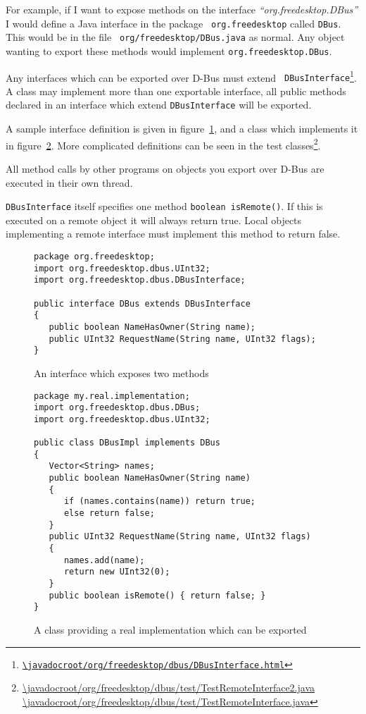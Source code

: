 \documentclass[a4paper,12pt]{article}
\begin{document}
For example, if I want to expose methods on the interface {\em
``org.freedesktop.DBus''} I would define a Java interface in the package {\tt
org.freedesktop} called {\tt DBus}. This would be in the file {\tt
org/freedesktop/DBus.java} as normal. Any object wanting to export these
methods would implement {\tt org.freedesktop.DBus}.

Any interfaces which can be exported over D-Bus must extend {\tt
DBusInterface\footnote{\url{\javadocroot/org/freedesktop/dbus/DBusInterface.html}}}.
A class may implement more than one exportable interface, all public methods
declared in an interface which extend {\tt DBusInterface} will be exported.

A sample interface definition is given in figure~\ref{fig:interface}, and a
class which implements it in figure~\ref{fig:class}. More complicated
definitions can be seen in the test
classes\footnote{\url{\javadocroot/org/freedesktop/dbus/test/TestRemoteInterface2.java}
\url{\javadocroot/org/freedesktop/dbus/test/TestRemoteInterface.java}}.

All method calls by other programs on objects you export over D-Bus
are executed in their own thread.

{\tt DBusInterface} itself specifies one method \verb&boolean isRemote()&. If
this is executed on a remote object it will always return true. Local objects
implementing a remote interface must implement this method to return false.

\begin{figure}[htb]
\begin{center}
\begin{verbatim}
package org.freedesktop;
import org.freedesktop.dbus.UInt32;
import org.freedesktop.dbus.DBusInterface;

public interface DBus extends DBusInterface
{
   public boolean NameHasOwner(String name);
   public UInt32 RequestName(String name, UInt32 flags);
}
\end{verbatim}
\end{center}
\caption{An interface which exposes two methods}
\label{fig:interface}
\end{figure}

\begin{figure}[htb]
\begin{center}
\begin{verbatim}
package my.real.implementation;
import org.freedesktop.dbus.DBus;
import org.freedesktop.dbus.UInt32;

public class DBusImpl implements DBus
{
   Vector<String> names;
   public boolean NameHasOwner(String name)
   {
      if (names.contains(name)) return true;
      else return false;
   }
   public UInt32 RequestName(String name, UInt32 flags)
   {
      names.add(name);
      return new UInt32(0);
   }
   public boolean isRemote() { return false; }
}
\end{verbatim}
\end{center}
\caption{A class providing a real implementation which can be exported}
\label{fig:class}
\end{figure}
\end{document}
